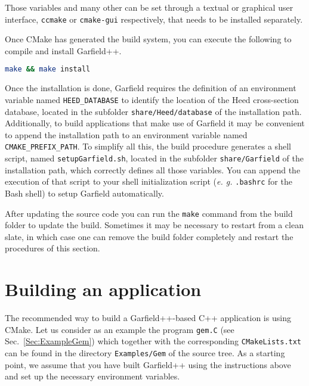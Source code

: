Those variables and many other can be set through a textual or graphical user interface, \texttt{ccmake} or \texttt{cmake-gui} respectively, that needs to be installed separately.

Once CMake has generated the build system, 
you can execute the following to compile and install Garfield++.

\begin{lstlisting}[language=bash]
make && make install
\end{lstlisting}

Once the installation is done, Garfield requires the definition of an 
environment variable named \texttt{HEED\_DATABASE} to identify the location 
of the Heed cross-section database, 
located in the subfolder \texttt{share/Heed/database} of the installation 
path. Additionally, to build applications that make use of Garfield 
it may be convenient to append the installation path to an environment 
variable named \texttt{CMAKE\_PREFIX\_PATH}. To simplify all this,
the build procedure generates a shell script, 
named \texttt{setupGarfield.sh}, located in the subfolder 
\texttt{share/Garfield} of the installation path, 
which correctly defines all those variables. 
You can append the execution of that script to your shell initialization 
script (\textit{e. g.} \texttt{.bashrc} for the Bash shell) to setup 
Garfield automatically.

After updating the source code you can run the \texttt{make} command 
from the build folder to update the build. 
Sometimes it may be necessary to restart from a clean slate, 
in which case one can remove the build folder completely and restart the procedures of this section.

\section{Building an application}
The recommended way to build a Garfield++-based C++ application is 
using CMake. Let us consider as an example the program \texttt{gem.C} 
(see Sec.~\ref{Sec:ExampleGem}) 
which together with the corresponding \texttt{CMakeLists.txt} can be 
found in the directory \texttt{Examples/Gem} of the source tree. 
As a starting point, we assume that you have built Garfield++ using the 
instructions above and set up the necessary environment variables. 


